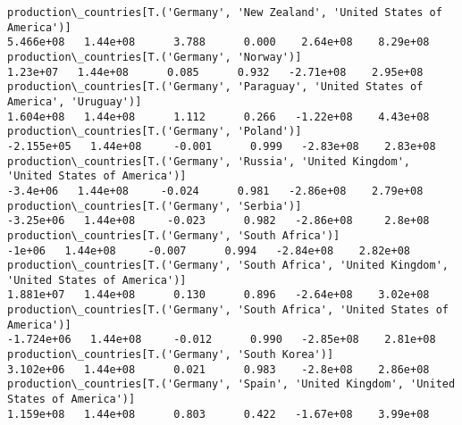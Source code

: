 \documentclass[11pt]{article}
\begin{document}
\begin{Verbatim}[commandchars=\\\{\}]
production\_countries[T.('Germany', 'New Zealand', 'United States of America')]                                                                                                         5.466e+08   1.44e+08      3.788      0.000    2.64e+08    8.29e+08
production\_countries[T.('Germany', 'Norway')]                                                                                                                                           1.23e+07   1.44e+08      0.085      0.932   -2.71e+08    2.95e+08
production\_countries[T.('Germany', 'Paraguay', 'United States of America', 'Uruguay')]                                                                                                 1.604e+08   1.44e+08      1.112      0.266   -1.22e+08    4.43e+08
production\_countries[T.('Germany', 'Poland')]                                                                                                                                         -2.155e+05   1.44e+08     -0.001      0.999   -2.83e+08    2.83e+08
production\_countries[T.('Germany', 'Russia', 'United Kingdom', 'United States of America')]                                                                                             -3.4e+06   1.44e+08     -0.024      0.981   -2.86e+08    2.79e+08
production\_countries[T.('Germany', 'Serbia')]                                                                                                                                          -3.25e+06   1.44e+08     -0.023      0.982   -2.86e+08     2.8e+08
production\_countries[T.('Germany', 'South Africa')]                                                                                                                                       -1e+06   1.44e+08     -0.007      0.994   -2.84e+08    2.82e+08
production\_countries[T.('Germany', 'South Africa', 'United Kingdom', 'United States of America')]                                                                                      1.881e+07   1.44e+08      0.130      0.896   -2.64e+08    3.02e+08
production\_countries[T.('Germany', 'South Africa', 'United States of America')]                                                                                                       -1.724e+06   1.44e+08     -0.012      0.990   -2.85e+08    2.81e+08
production\_countries[T.('Germany', 'South Korea')]                                                                                                                                     3.102e+06   1.44e+08      0.021      0.983    -2.8e+08    2.86e+08
production\_countries[T.('Germany', 'Spain', 'United Kingdom', 'United States of America')]                                                                                             1.159e+08   1.44e+08      0.803      0.422   -1.67e+08    3.99e+08

\end{Verbatim}
\end{document}
